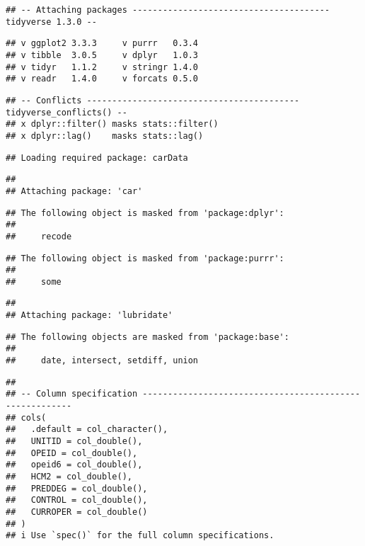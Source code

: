 \documentclass[
]{article}
\begin{document}
\begin{verbatim}
## -- Attaching packages --------------------------------------- tidyverse 1.3.0 --
\end{verbatim}

\begin{verbatim}
## v ggplot2 3.3.3     v purrr   0.3.4
## v tibble  3.0.5     v dplyr   1.0.3
## v tidyr   1.1.2     v stringr 1.4.0
## v readr   1.4.0     v forcats 0.5.0
\end{verbatim}

\begin{verbatim}
## -- Conflicts ------------------------------------------ tidyverse_conflicts() --
## x dplyr::filter() masks stats::filter()
## x dplyr::lag()    masks stats::lag()
\end{verbatim}

\begin{verbatim}
## Loading required package: carData
\end{verbatim}

\begin{verbatim}
## 
## Attaching package: 'car'
\end{verbatim}

\begin{verbatim}
## The following object is masked from 'package:dplyr':
## 
##     recode
\end{verbatim}

\begin{verbatim}
## The following object is masked from 'package:purrr':
## 
##     some
\end{verbatim}

\begin{verbatim}
## 
## Attaching package: 'lubridate'
\end{verbatim}

\begin{verbatim}
## The following objects are masked from 'package:base':
## 
##     date, intersect, setdiff, union
\end{verbatim}

\begin{verbatim}
## 
## -- Column specification --------------------------------------------------------
## cols(
##   .default = col_character(),
##   UNITID = col_double(),
##   OPEID = col_double(),
##   opeid6 = col_double(),
##   HCM2 = col_double(),
##   PREDDEG = col_double(),
##   CONTROL = col_double(),
##   CURROPER = col_double()
## )
## i Use `spec()` for the full column specifications.
\end{verbatim}
\end{document}
